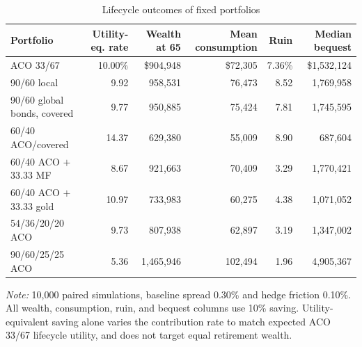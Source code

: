 \documentclass[11pt]{article}
\begin{document}
\begin{table}[t]
\centering
\caption{Lifecycle outcomes of fixed portfolios}
\label{tab:lifecycle}
\setlength{\tabcolsep}{2.8pt}
\small
\begin{tabular}{lrrrrr}
\toprule
Portfolio & Utility-eq. rate & Wealth at 65 & Mean consumption & Ruin & Median bequest \\
\midrule
ACO 33/67 & 10.00\% & \$904,948 & \$72,305 & 7.36\% & \$1,532,124 \\
90/60 local & 9.92 & 958,531 & 76,473 & 8.52 & 1,769,958 \\
90/60 global bonds, covered & 9.77 & 950,885 & 75,424 & 7.81 & 1,745,595 \\
60/40 ACO/covered & 14.37 & 629,380 & 55,009 & 8.90 & 687,604 \\
60/40 ACO $+$ 33.33 MF & 8.67 & 921,663 & 70,409 & 3.29 & 1,770,421 \\
60/40 ACO $+$ 33.33 gold & 10.97 & 733,983 & 60,275 & 4.38 & 1,071,052 \\
54/36/20/20 ACO & 9.73 & 807,938 & 62,897 & 3.19 & 1,347,002 \\
90/60/25/25 ACO & 5.36 & 1,465,946 & 102,494 & 1.96 & 4,905,367 \\
\bottomrule
\end{tabular}
\begin{minipage}{0.98\textwidth}\footnotesize
\textit{Note:} 10,000 paired simulations, baseline spread 0.30\% and hedge friction 0.10\%.
All wealth, consumption, ruin, and bequest columns use 10\% saving.
\mbox{Utility-equivalent} saving alone varies the contribution rate to match expected ACO
33/67 lifecycle utility, and does not target equal retirement wealth.
\end{minipage}
\end{table}
\end{document}
